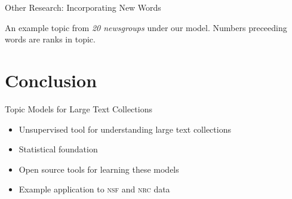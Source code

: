 \documentclass[compress]{beamer}
\begin{document}
\begin{frame}{Other Research: Incorporating New Words}
\begin{center}
\vspace{-5mm}
An example topic from \textit{20 newsgroups} under our model.
Numbers preceeding words are ranks in topic.
\end{center}

\end{frame}


\section{Conclusion}

\begin{frame}{Topic Models for Large Text Collections}

  \begin{itemize}
    \item Unsupervised tool for understanding large text collections
    \item Statistical foundation
    \item Open source tools for learning these models
    \item Example application to \textsc{nsf} and \textsc{nrc} data
  \end{itemize}

\end{frame}
\end{document}
